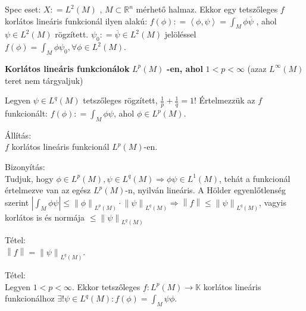\documentclass[12pt,a4paper]{scrartcl}
\newenvironment{tetel}{}{}
\newenvironment{bizonyitas}{}{}
\newenvironment{allitas}{}{}
\begin{document}
Spec eset: \(X: = L^{2}\left( M \right)\) ,
\(M \subset {\mathbb{R}}^{n}\) mérhető halmaz. Ekkor egy tetszőleges
\(f\) korlátos lineáris funkcionál ilyen alakú:
\(f\left( \phi \right): = \left\langle {\phi,\psi} \right\rangle = {\int_{M}{\phi\overline{\psi}}}\)
, ahol \(\psi \in L^{2}\left( M \right)\) rögzített.
\(\psi_{0}: = \overline{\psi} \in L^{2}\left( M \right)\) jelöléssel
\(f\left( \phi \right) = {\int_{M}{\phi\psi_{0}}},\forall\phi \in L^{2}\left( M \right)\).

\textbf{Korlátos lineáris funkcionálok} \(L^{p}\left( M \right)\)
\textbf{-en, ahol} \(1 < p < \infty\) (azaz
\(L^{\infty}\left( M \right)\) teret nem tárgyaljuk)

Legyen \(\psi \in L^{q}\left( M \right)\) tetszőleges rögzített,
\(\frac{1}{p} + \frac{1}{q} = 1\)! Értelmezzük az \(f\) funkcionált:
\(f\left( \phi \right): = {\int_{M}{\phi\psi}}\), ahol
\(\phi \in L^{p}\left( M \right)\).

\begin{allitas}

Állítás:\\
\(f\) korlátos lineáris funkcionál \(L^{p}\left( M \right)\)-en.

\end{allitas}

\begin{bizonyitas}

Bizonyítás:\\
Tudjuk, hogy
\(\left. \phi \in L^{p}\left( M \right),\psi \in L^{q}\left( M \right)\Rightarrow\phi\psi \in L^{1}\left( M \right) \right.\),
tehát a funkcionál értelmezve van az egész \(L^{p}\left( M \right)\)-n,
nyilván lineáris. A Hölder egyenlőtlenség szerint
\(\left. \left| {\int_{M}{\phi\psi}} \right| \leq \left\| \phi \right\|_{L^{p}{(M)}} \cdot \left\| \psi \right\|_{L^{q}{(M)}}\Rightarrow\left\| f \right\| \leq \left\| \psi \right\|_{L^{q}{(M)}} \right.\),
vagyis korlátos is és normája
\(\leq \left\| \psi \right\|_{L^{q}{(M)}}\)

\end{bizonyitas}

\begin{tetel}

Tétel:\\
\(\left\| f \right\| = \left\| \psi \right\|_{L^{q}{(M)}}\).

\end{tetel}

\begin{tetel}

Tétel:\\
Legyen \(1 < p < \infty\). Ekkor tetszőleges
\(\left. f:L^{p}\left( M \right)\rightarrow{\mathbb{K}} \right.\)
korlátos lineáris funkcionálhoz
\(\exists!\psi \in L^{q}\left( M \right):f\left( \phi \right) = {\int_{M}{\psi\phi}}\).

\end{tetel}
\end{document}
